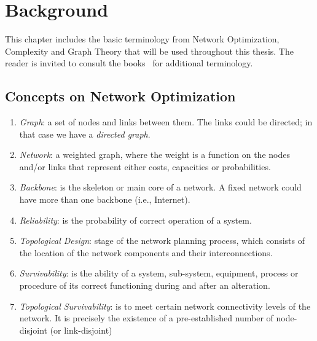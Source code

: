 \chapter{Background}\label{background}
This chapter includes the basic terminology from Network Optimization, Complexity and 
Graph Theory that will be used throughout this thesis. The reader is invited 
to consult the books~\cite{25,3,4,7} for additional terminology.


\section{Concepts on Network Optimization}
\begin{enumerate}
	 \item \emph{Graph}: a set of nodes and links between them. The links could be directed; in that case we have a \emph{directed graph}. 
    \item \emph{Network}: a weighted graph, where the weight is a function on the nodes and/or links that represent either costs, capacities or probabilities. 
    \item \emph{Backbone}: is the skeleton or main core of a network. A fixed network could have more than 
    one backbone (i.e., Internet). 
    \item \emph{Reliability}: is the probability of correct operation of a system.
    \item \emph{Topological Design}: stage of the network planning process, which consists of 
    the location of the network components and their interconnections.
    \item \emph{Survivability}: is the ability of a system, sub-system, equipment, process or procedure of 
    its correct functioning during and after an alteration.
    \item \emph{Topological Survivability}: is to meet certain network connectivity levels of the network. 
It is precisely the existence of a pre-established number of node-disjoint (or link-disjoint) 

\end{enumerate}
